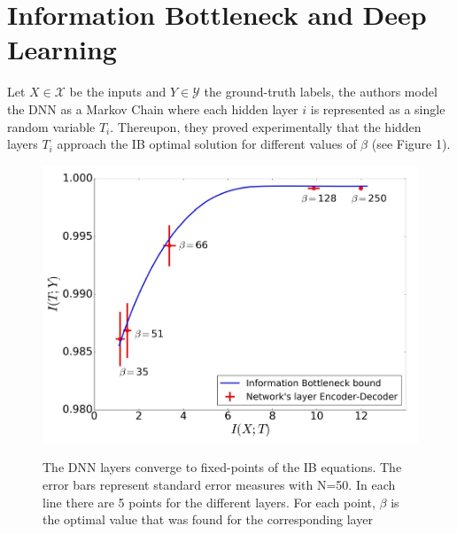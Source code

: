 \documentclass[twocolumn,superscriptaddress,aps]{revtex4-1}
\begin{document}
\section{Information Bottleneck and Deep Learning}

Let $X \in \mathcal{X}$ be the inputs and $Y \in \mathcal{Y}$ the ground-truth labels, the authors model the DNN as a Markov Chain where each hidden layer $i$ is represented as  a single random variable $T_i$. Thereupon, they proved experimentally that the hidden layers $T_i$ approach the IB optimal solution for different values of $\beta$ (see Figure 1).\\

\begin{figure}[!htb]
\includegraphics[width=\linewidth, height=\textheight, keepaspectratio]{figs/ib-curve.jpeg}
\label{fig:ib-curve}
\caption{The DNN layers converge to fixed-points of the IB equations. The error bars represent standard error measures with N=50. In each line there are 5 points for the different layers. For each point, $\beta$ is the optimal value that was found for the corresponding layer}
\end{figure}
\end{document}
